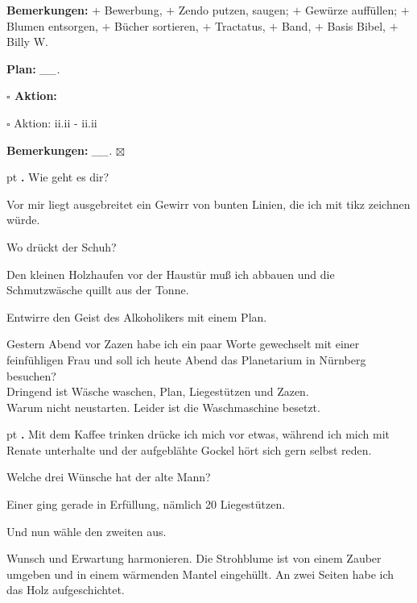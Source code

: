 \documentclass[10pt,a4paper]{article}
\newcounter{notec}
\newcommand\notep[1]{%
  \stepcounter{notec}
  \vskip #1pt
  {\bf\arabic{notec}.}
}
\newcommand\prop[1] {{\color {alizarin} {\bf #1}}}        %
\newcommand\mand[1] {{\color {burntorange} {\bf #1}}}     %
\newcommand\topspace{\vskip -15pt \hskip 20pt}
\newcommand\bottomspace{\vskip 4pt}
\newcommand\n[1] { {\sl #1.} \hskip 5pt }
\begin{document}
\begin{mdframed}[style=daystyle]
\begin{labeling}{{\mand {Bemerkungen:}}}
    $+$ Bewerbung,
    $+$ Zendo putzen, saugen; $+$ Gewürze auffüllen; $+$ Blumen entsorgen, $+$ Bücher sortieren,
    $+$ Tractatus, $+$ Band, $+$ Basis Bibel, $+$ Billy W.  
  \item[{\mand {Plan:}}]         \n{\_\_}
    \topspace
    \begin{minipage}{0.75\textwidth}  
      \begin{labeling}{\prop {$\square$ {Aktion:}}} 
        \setlength\itemsep{-3pt}
      \item[$\square$ Aktion:]  ii.ii - ii.ii
      \end{labeling}
    \end{minipage}
    \bottomspace
  \item[{\mand {Bemerkungen:}}]  \n{\_\_} $\boxtimes$
  \end{labeling}
    
  \setcounter{notec}{0}
  
  \notep 0 Wie geht es dir?

  \vskip 2pt
  Vor mir liegt ausgebreitet ein Gewirr von bunten Linien, die ich mit tikz
  zeichnen würde.

  \vskip 2pt
  Wo drückt der Schuh?

  \vskip 2pt
  Den kleinen Holzhaufen vor der Haustür muß ich abbauen und die Schmutzwäsche
  quillt aus der Tonne.

  \vskip 2pt
  Entwirre den Geist des Alkoholikers mit einem Plan.

  \vskip 2pt
  Gestern Abend vor Zazen habe ich ein paar Worte gewechselt mit einer
  feinfühligen Frau und soll ich heute Abend das Planetarium in Nürnberg
  besuchen? \\
  Dringend ist Wäsche waschen, Plan, Liegestützen und Zazen. \\
  Warum nicht neustarten. Leider ist die Waschmaschine besetzt.

  \notep 4 Mit dem Kaffee trinken drücke ich mich vor etwas, während ich mich mit
  Renate unterhalte und der aufgeblähte Gockel hört sich gern selbst reden.

  \vskip 2pt
  Welche drei Wünsche hat der alte Mann?

  \vskip 2pt
  Einer ging gerade in Erfüllung, nämlich 20 Liegestützen.

  \vskip 2pt
  Und nun wähle den zweiten aus.

  \vskip 2pt
  Wunsch und Erwartung harmonieren. Die Strohblume ist von einem Zauber umgeben
  und in einem wärmenden Mantel eingehüllt. An zwei Seiten habe ich das Holz
  aufgeschichtet.


\end{mdframed}
\end{document}
